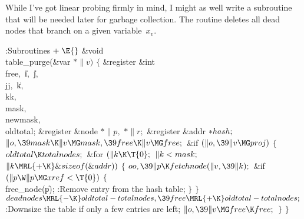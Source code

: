 While I've got linear probing firmly in mind, I might as well
write a subroutine that will be needed later for garbage collection.
The  routine deletes all dead nodes that branch
on a given variable~$x_v$.

\Y\B\4:Subroutines\X${}\mathrel+\E{}$\6
\&{void} \\{table\_purge}(\&{var} ${}{*}\|v){}$\1\1\2\2\6
${}\{{}$\1\6
\&{register} \&{int} \\{free}${},{}$ \|i${},{}$ \|j${},{}$ \\{jj}${},{}$ %
\|k${},{}$ \\{kk}${},{}$ \\{mask}${},{}$ \\{newmask}${},{}$ \\{oldtotal};\6
\&{register} \&{node} ${}{*}\|p,{}$ ${}{*}\|r;{}$\6
\&{register} \&{addr} ${}{*}\\{hash};{}$\7
${}\|o,\39\\{mask}\K\|v\MG\\{mask},\39\\{free}\K\|v\MG\\{free};{}$\6
\&{if} ${}(\|o,\39\|v\MG\\{proj}){}$\5
${}\{{}$\1\6
${}\\{oldtotal}\K\\{totalnodes};{}$\6
\&{for} ${}(\|k\K\T{0};{}$ ${}\|k<\\{mask};{}$ ${}\|k\MRL{+{\K}}\&{sizeof}(%
\&{addr})){}$\5
${}\{{}$\1\6
${}\\{oo},\39\|p\K\\{fetchnode}(\|v,\39\|k);{}$\6
\&{if} ${}(\|p\W\|p\MG\\{xref}<\T{0}){}$\5
${}\{{}$\1\6
\\{free\_node}(\|p);\6
:Remove entry  from the hash table\X;\6
\4${}\}{}$\2\6
\4${}\}{}$\2\6
${}\\{deadnodes}\MRL{-{\K}}\\{oldtotal}-\\{totalnodes},\39\\{free}\MRL{+{\K}}%
\\{oldtotal}-\\{totalnodes};{}$\6
:Downsize the table if only a few entries are left\X;\6
${}\|o,\39\|v\MG\\{free}\K\\{free};{}$\6
\4${}\}{}$\2\6
\4${}\}{}$\2\par
\fi

